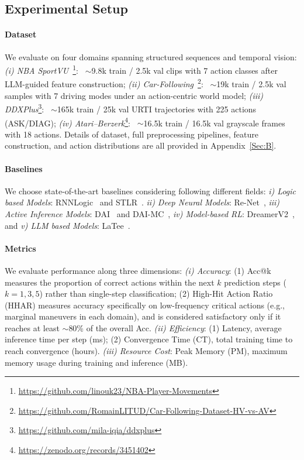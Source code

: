 \documentclass{article} %
\begin{document}
\subsection{Experimental Setup}

\paragraph{Dataset}
We evaluate on four domains spanning structured sequences and temporal vision:
\emph{(i) NBA SportVU}~\citep{kambhamettu2024quantifying}\footnote{\url{https://github.com/linouk23/NBA-Player-Movements}}:
~$\sim$9.8k train / 2.5k val clips with 7 action classes after LLM-guided feature construction;
\emph{(ii) Car-Following}~\citep{li2023large}\footnote{\url{https://github.com/RomainLITUD/Car-Following-Dataset-HV-vs-AV}}:
~$\sim$19k train / 2.5k val samples with 7 driving modes under an action-centric world model;
\emph{(iii) DDXPlus}\footnote{\url{https://github.com/mila-iqia/ddxplus}}:
~$\sim$165k train / 25k val URTI trajectories with 225 actions (ASK/DIAG);
\emph{(iv) Atari--Berzerk}\footnote{\url{https://zenodo.org/records/3451402}}:
~$\sim$16.5k train / 16.5k val grayscale frames with 18 actions.
Details of dataset, full preprocessing pipelines, feature construction, and action distributions are all provided in Appendix~\ref{Sec:B}.


\paragraph{Baselines} We choose state-of-the-art baselines considering following different fields: {\it i) Logic based Models}: RNNLogic~\citep{qu2020rnnlogic} and STLR~\citep{cao2023discovering}. {\it ii) Deep Neural Models}: Re-Net~\citep{jin2019recurrent}, {\it iii) Active Inference Models}: DAI~\citep{ccatal2020learning} and DAI-MC~\citep{fountas2020deep}, {\it iv) Model-based RL}: DreamerV2~\citep{hafner2020mastering}, and {\it v) LLM based Models}: LaTee~\citep{song2024latent}.

\paragraph{Metrics} 
We evaluate performance along three dimensions:  
{\it (i) Accuracy}: (1) Acc@k measures the proportion of correct actions within the next $k$ prediction steps 
($k{=}1,3,5$) rather than single-step classification; 
(2) High-Hit Action Ratio (HHAR) measures accuracy specifically on low-frequency critical actions 
(e.g., marginal maneuvers in each domain), and is considered satisfactory only if it reaches at least 
$\sim$80\% of the overall Acc.  
{\it (ii) Efficiency}: (1) Latency, average inference time per step (ms); 
(2) Convergence Time (CT), total training time to reach convergence (hours).  
{\it (iii) Resource Cost}: Peak Memory (PM), maximum memory usage during training and inference (MB).
\end{document}
